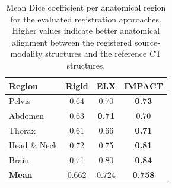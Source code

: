 \begin{table}[h!]
\centering
\caption{Mean Dice coefficient per anatomical region for the evaluated registration approaches. Higher values indicate better anatomical alignment between the registered source-modality structures and the reference CT structures.}
\label{tab:diceimpactreg}
\begin{tabular}{lccc}
\toprule
\textbf{Region} & \textbf{Rigid} & \textbf{ELX} & \textbf{IMPACT} \\
\midrule
Pelvis & 0.64 & 0.70 & \textbf{0.73} \\
Abdomen & 0.63 & \textbf{0.71} & 0.70 \\
Thorax & 0.61 & 0.66 & \textbf{0.71} \\
Head \& Neck & 0.72 & 0.75 & \textbf{0.81} \\
Brain & 0.71 & 0.80 & \textbf{0.84} \\
\midrule
\textbf{Mean} & 0.662 & 0.724 & \textbf{0.758} \\
\bottomrule
\end{tabular}

\end{table}
